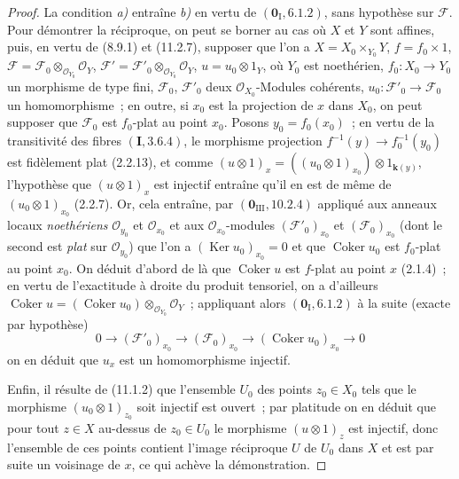 \begin{proof}
La condition \emph{a)} entraîne \emph{b)} en vertu de $(\mathbf 0_{\mathrm I},6.1.2)$, sans
hypothèse sur $\mathcal F$. Pour démontrer la réciproque, on peut se borner au
cas où $X$ et $Y$ sont affines, puis, en vertu de (8.9.1) et (11.2.7), supposer
que l'on a
$X=X_0\times_{Y_0}Y$, $f=f_0\times1$,
$\mathcal F=\mathcal F_0\otimes_{\mathcal O_{Y_0}}\mathcal O_Y$,
$\mathcal F'=\mathcal F'_0\otimes_{\mathcal O_{Y_0}}\mathcal O_Y$, $u=u_0\otimes1_Y$,
où $Y_0$ est noethérien, $f_0:X_0\to Y_0$ un morphisme de type fini,
$\mathcal F_0$, $\mathcal F'_0$ deux $\mathcal O_{X_0}$-Modules cohérents,
$u_0:\mathcal F'_0\to\mathcal F_0$ un homomorphisme~; en outre, si $x_0$ est la
projection de $x$ dans $X_0$, on peut supposer que $\mathcal F_0$ est
$f_0$-plat au point $x_0$. Posons $y_0=f_0(x_0)$~; en vertu de la transitivité
des fibres $(\mathbf I,3.6.4)$, le morphisme projection
$f^{-1}(y)\to f_0^{-1}(y_0)$ est fidèlement plat (2.2.13), et comme
$(u\otimes1)_x=((u_0\otimes1)_{x_0})\otimes1_{\mathbf{k}(y)}$,
l'hypothèse que $(u\otimes1)_x$ est injectif entraîne qu'il en est de même de
$(u_0\otimes1)_{x_0}$ (2.2.7). Or, cela entraîne, par
$(\mathbf 0_{\mathrm{III}},10.2.4)$ appliqué aux anneaux locaux \emph{noethériens}
$\mathcal O_{y_0}$ et $\mathcal O_{x_0}$ et aux
$\mathcal O_{x_0}$-modules $(\mathcal F'_0)_{x_0}$ et
$(\mathcal F_0)_{x_0}$ (dont le second est \emph{plat} sur $\mathcal O_{y_0}$)
que l'on a $(\operatorname{Ker}u_0)_{x_0}=0$ et que $\operatorname{Coker}u_0$ est
$f_0$-plat au point $x_0$. On déduit d'abord de là que
$\operatorname{Coker}u$ est $f$-plat au point $x$ (2.1.4)~; en vertu de
l'exactitude à droite du produit tensoriel, on a d'ailleurs
$\operatorname{Coker}u=(\operatorname{Coker}u_0)
 \otimes_{\mathcal O_{Y_0}}\mathcal O_Y$~;
appliquant alors $(\mathbf 0_{\mathrm I},6.1.2)$ à la suite (exacte par
hypothèse)
\[
0\longrightarrow(\mathcal F'_0)_{x_0}\longrightarrow
(\mathcal F_0)_{x_0}\longrightarrow(\operatorname{Coker}u_0)_{x_0}
\longrightarrow0
\]
on en déduit que $u_x$ est un homomorphisme injectif.

Enfin, il résulte de (11.1.2) que l'ensemble $U_0$ des points $z_0\in X_0$ tels
que le morphisme $(u_0\otimes1)_{z_0}$ soit injectif est ouvert~; par platitude
on en déduit que pour tout $z\in X$ au-dessus de $z_0\in U_0$ le morphisme
$(u\otimes1)_z$ est injectif, donc l'ensemble de ces points contient l'image
réciproque $U$ de $U_0$ dans $X$ et est par suite un voisinage de $x$, ce qui
achève la démonstration.
\end{proof}

